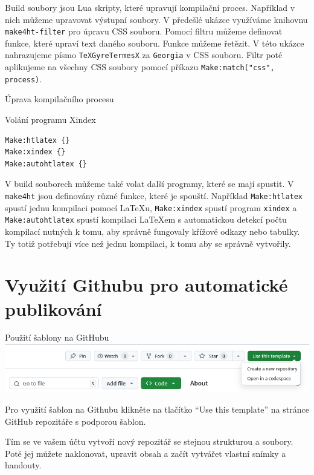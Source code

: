 Build soubory jsou Lua skripty, které upravují kompilační proces. Například 
v nich můžeme upravovat výstupní soubory. V předešlé ukázce využíváme 
knihovnu \texttt{make4ht-filter} pro úpravu CSS souboru. Pomocí filtru 
můžeme definovat funkce, které upraví text daného souboru. Funkce můžeme řetězit.
V této ukázce nahrazujeme písmo \texttt{TeXGyreTermesX} za \texttt{Georgia} v CSS souboru.
Filtr poté aplikujeme na všechny CSS soubory pomocí příkazu \texttt{Make:match("css", process)}.

\begin{frame}[fragile]{Úprava kompilačního procesu}
\begin{block}{Volání programu Xindex}
\begin{verbatim}
Make:htlatex {} 
Make:xindex {} 
Make:autohtlatex {}
\end{verbatim}
\end{block}

\end{frame}

V build souborech můžeme také volat další programy, které se mají spustit. V \texttt{make4ht}
jsou definovány různé funkce, které je spouští. Například \texttt{Make:htlatex} spustí
jednu kompilaci pomocí \LaTeX u, \texttt{Make:xindex} spustí program \texttt{xindex}
a \texttt{Make:autohtlatex} spustí kompilaci \LaTeX em s automatickou detekcí počtu kompilací
nutných k tomu, aby správně fungovaly křížové odkazy nebo tabulky. Ty totiž potřebují více než jednu kompilaci, k tomu
aby se správně vytvořily.


\section{Využití Githubu pro automatické publikování}

\begin{frame}[fragile]{Použití šablony na GitHubu}
  \includegraphics[width=\textwidth,alt={}]{img/template-use.png}
\end{frame}

Pro využití šablon na Githubu klikněte na tlačítko
\enquote{Use this template} na stránce GitHub repozitáře s podporou šablon. 

Tím se ve vašem účtu vytvoří
nový repozitář se stejnou strukturou a soubory. Poté jej můžete naklonovat,
upravit obsah a začít vytvářet vlastní snímky a handouty.

